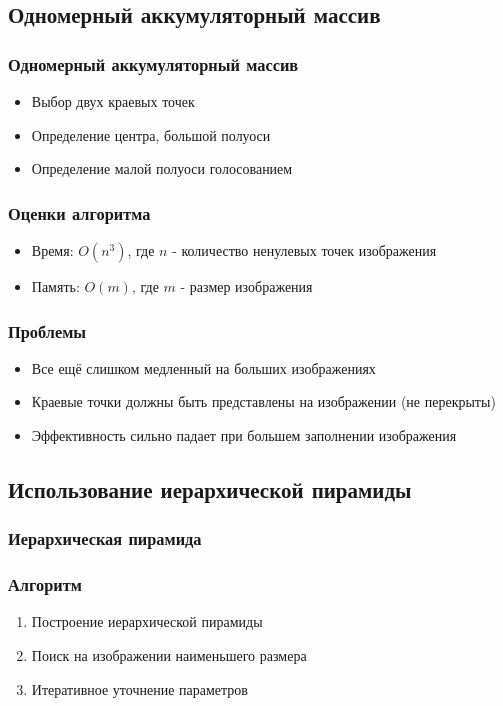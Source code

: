 \documentclass[14pt]{beamer}
\begin{document}
\subsection{Одномерный аккумуляторный массив}
\begin{frame}
\frametitle{Одномерный аккумуляторный массив}
\begin{itemize}
  \item Выбор двух краевых точек
  \item Определение центра, большой полуоси
  \item Определение малой полуоси голосованием
\end{itemize}
\end{frame}

\begin{frame}
\frametitle{Оценки алгоритма}
\begin{itemize}
  \item Время: \(O(n^3)\), где \(n\) - количество ненулевых точек изображения
  \item Память: \(O(m)\), где \(m\) - размер изображения
\end{itemize}
\end{frame}

\begin{frame}
\frametitle{Проблемы}
\begin{itemize}
  \item Все ещё слишком медленный на больших изображениях
  \item Краевые точки должны быть представлены на изображении (не перекрыты)
  \item Эффективность сильно падает при большем заполнении изображения
\end{itemize}
\end{frame}

\subsection{Использование иерархической пирамиды}
\begin{frame}
\frametitle{Иерархическая пирамида}

\end{frame}

\begin{frame}
\frametitle{Алгоритм}
\begin{enumerate}
  \item Построение иерархической пирамиды
  \item Поиск на изображении наименьшего размера
  \item Итеративное уточнение параметров
\end{enumerate}
\end{frame}
\end{document}
